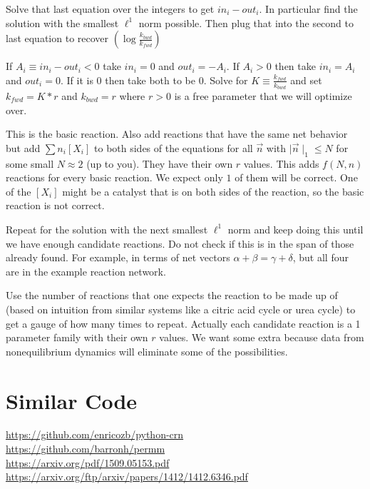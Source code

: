 \documentclass[11pt]{book}
\theoremstyle{change}
\theoremstyle{nonumberplain}
\numberwithin{equation}{section}
\newcommand\abs[1]{ \mid #1 \mid }
\begin{document}
Solve that last equation over the integers to get $in_i - out_i$. In particular find the solution with the smallest $\ell^1$ norm possible. Then plug that into the second to last equation to recover $(\log \frac{k_{bwd}}{k_{fwd}} )$

If $A_i \equiv in_i - out_i < 0$ take $in_i = 0$ and $out_i = -A_i$. If $A_i > 0$ then take $in_i = A_i$ and $out_i=0$. If it is $0$ then take both to be $0$. Solve for $K \equiv \frac{k_{fwd}}{k_{bwd}}$ and set $k_{fwd}=K*r$ and $k_{bwd}=r$ where $r>0$ is a free parameter that we will optimize over.

This is the basic reaction. Also add reactions that have the same net behavior but add $\sum n_i [X_i]$ to both sides of the equations for all $\vec{n}$ with $\abs{ \vec{n} }_1 \leq N$ for some small $N \approx 2$ (up to you). They have their own $r$ values. This adds $f(N,n)$ reactions for every basic reaction. We expect only $1$ of them will be correct. One of the $[X_i]$ might be a catalyst that is on both sides of the reaction, so the basic reaction is not correct.

Repeat for the solution with the next smallest $\ell^1$ norm and keep doing this until we have enough candidate reactions. Do not check if this is in the span of those already found. For example, in terms of net vectors $\alpha + \beta = \gamma + \delta$, but all four are in the example reaction network.

Use the number of reactions that one expects the reaction to be made up of (based on intuition from similar systems like a citric acid cycle or urea cycle) to get a gauge of how many times to repeat. Actually each candidate reaction is a 1 parameter family with their own $r$ values. We want some extra because data from nonequilibrium dynamics will eliminate some of the possibilities.

\section{Similar Code}

\url{https://github.com/enricozb/python-crn}\\
\url{https://github.com/barronh/permm}\\
\url{https://arxiv.org/pdf/1509.05153.pdf}\\
\url{https://arxiv.org/ftp/arxiv/papers/1412/1412.6346.pdf}
\end{document}
